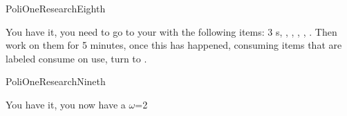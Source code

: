 \documentclass[greennotebook]{guildcamp3} %
\begin{document}
\begin{page}{PoliOneResearchEighth}
	
	 You have it, you need to go to your \sTechWorkbench{} with the following items: 3 \iTFResistor{}s, \iScrapMetal{}, \iCog{}, \iCircuitBoard{}, \iFlashlight{}, \iMultitool{}. Then work on them for 5 minutes, once this has happened, consuming items that are labeled consume on use, turn to .
	
\end{page}

\begin{page}{PoliOneResearchNineth}
	
	You have it, you now have a {$\omega$}={2}
	
\end{page}

\endnotebook
\end{document}
